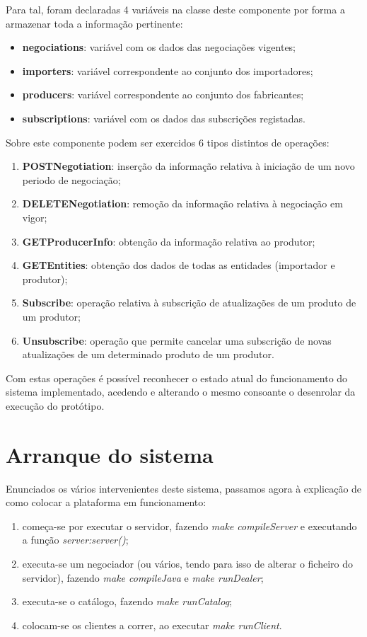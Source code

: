 \documentclass[a4paper]{report}
\begin{document}
	Para tal, foram declaradas 4 variáveis na classe deste componente por forma a armazenar toda a informação pertinente:
	\begin{itemize}
		\item \textbf{negociations}: variável com os dados das negociações vigentes;
		\item \textbf{importers}: variável correspondente ao conjunto dos importadores;
		\item \textbf{producers}: variável correspondente ao conjunto dos fabricantes;
		\item \textbf{subscriptions}: variável com os dados das subscrições registadas.
	\end{itemize}
	Sobre este componente podem ser exercidos 6 tipos distintos de operações:
	\begin{enumerate}
		\item \textbf{POSTNegotiation}: inserção da informação relativa à iniciação de um novo periodo de negociação;
		\item \textbf{DELETENegotiation}: remoção da informação relativa à negociação em vigor;
		\item \textbf{GETProducerInfo}: obtenção da informação relativa ao produtor;
		\item \textbf{GETEntities}: obtenção dos dados de todas as entidades (importador e produtor);
		\item \textbf{Subscribe}: operação relativa à subscrição de atualizações de um produto de um produtor;
		\item \textbf{Unsubscribe}: operação que permite cancelar uma subscrição de novas atualizações de um determinado produto de um produtor.
	\end{enumerate}
	Com estas operações é possível reconhecer o estado atual do funcionamento do sistema implementado, acedendo e alterando o mesmo consoante o desenrolar da execução do protótipo.

	\section{Arranque do sistema}
	Enunciados os vários intervenientes deste sistema, passamos agora à explicação de como colocar a plataforma em funcionamento:

	\begin{enumerate}
		\item começa-se por executar o servidor, fazendo \textit{make compileServer} e executando a função \textit{server:server()};
	
		\item executa-se um negociador (ou vários, tendo para isso de alterar o ficheiro do servidor), fazendo \textit{make compileJava} e \textit{make runDealer};
	
		\item executa-se o catálogo, fazendo \textit{make runCatalog};
	
		\item colocam-se os clientes a correr, ao executar \textit{make runClient}.
	\end{enumerate}
\end{document}
